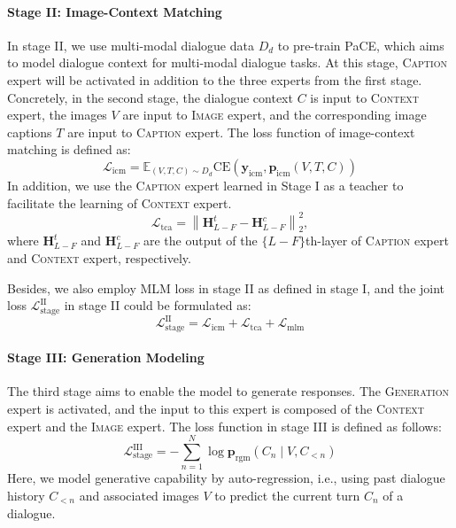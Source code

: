 \documentclass[11pt]{article}
\begin{document}
\paragraph{Stage II: Image-Context Matching}
In stage II, we use multi-modal dialogue data $D_d$ to pre-train PaCE, which aims to model dialogue context for multi-modal dialogue tasks. At this stage,  \textsc{Caption} expert will be activated in addition to the three experts from the first stage. Concretely, in the second stage, the dialogue context $C$ is input to \textsc{Context} expert, the images $V$ are input to \textsc{Image} expert, and the corresponding image captions $T$ are input to  \textsc{Caption} expert. The loss function of  image-context matching is defined as:
\begin{equation}
\mathcal{L}_{\mathrm{icm}}=\mathbb{E}_{(V, T, C) \sim D_d} \mathrm{CE}\left(\boldsymbol{y}_{\mathrm{icm}}, \boldsymbol{p}_{\mathrm{icm}}(V, T, C)\right)
\end{equation}
In addition, we use the \textsc{Caption} expert learned in Stage I as a teacher to facilitate the learning of \textsc{Context} expert.
\begin{equation}
\mathcal{L}_{\mathrm{tca}}= \left\|\boldsymbol{H}_{L-F}^t-\boldsymbol{H}_{L-F}^c\right\|_2^2,
\end{equation}
where $\boldsymbol{H}_{L-F}^t$ and $\boldsymbol{H}_{L-F}^c$ are the output of the $\{L-F\}$th-layer of \textsc{Caption} expert and \textsc{Context} expert, respectively.

Besides, we also employ MLM loss in stage II as defined in stage I, and the joint loss $\mathcal{L}_{\mathrm{stage}}^{\mathrm{II}}$ in stage II could be formulated as:
\begin{equation}
\mathcal{L}_{\mathrm{stage}}^{\mathrm{II}} = \mathcal{L}_{\mathrm{icm}} + \mathcal{L}_{\mathrm{tca}} +  \mathcal{L}_{\mathrm{mlm}}
\end{equation}

\paragraph{Stage III: Generation Modeling}
The third stage aims to enable the model to generate responses. The \textsc{Generation} expert is activated, and the input to this expert is composed of the \textsc{Context} expert and the \textsc{Image} expert. The loss function in stage III is defined as follows:
\begin{equation}
\mathcal{L}_{\mathrm{stage}}^{\mathrm{III}}=-\sum_{n=1}^N \log \boldsymbol{p}_{\mathrm{rgm}}\left(C_n \mid V, C_{<n}\right)
\end{equation}
Here, we model generative capability by auto-regression, i.e., using past dialogue history $C_{<n}$ and associated images $V$ to predict the current turn $C_n$ of a dialogue.
\end{document}
